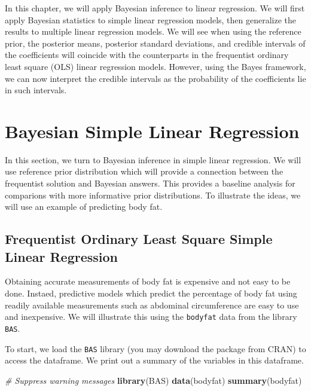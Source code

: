 \documentclass[]{book}
\newenvironment{Shaded}{\begin{snugshade}}{\end{snugshade}}
\newcommand{\KeywordTok}[1]{\textcolor[rgb]{0.13,0.29,0.53}{\textbf{#1}}}
\newcommand{\CommentTok}[1]{\textcolor[rgb]{0.56,0.35,0.01}{\textit{#1}}}
\newcommand{\NormalTok}[1]{#1}
\theoremstyle{definition}
\theoremstyle{definition}
\theoremstyle{definition}
\theoremstyle{remark}
\begin{document}
In this chapter, we will apply Bayesian inference to linear regression.
We will first apply Bayesian statistics to simple linear regression
models, then generalize the results to multiple linear regression
models. We will see when using the reference prior, the posterior means,
posterior standard deviations, and credible intervals of the
coefficients will coincide with the counterparts in the frequentist
ordinary least square (OLS) linear regression models. However, using the
Bayes framework, we can now interpret the credible intervals as the
probability of the coefficients lie in such intervals.

\section{Bayesian Simple Linear
Regression}\label{bayesian-simple-linear-regression}

In this section, we turn to Bayesian inference in simple linear
regression. We will use reference prior distribution which will provide
a connection between the frequentist solution and Bayesian answers. This
provides a baseline analysis for comparions with more informative prior
distributions. To illustrate the ideas, we will use an example of
predicting body fat.

\subsection{Frequentist Ordinary Least Square Simple Linear
Regression}\label{frequentist-ordinary-least-square-simple-linear-regression}

Obtaining accurate measurements of body fat is expensive and not easy to
be done. Instaed, predictive models which predict the percentage of body
fat using readily available measurements such as abdominal circumference
are easy to use and inexpensive. We will illustrate this using the
\texttt{bodyfat} data from the library \texttt{BAS}.

To start, we load the \texttt{BAS} library (you may download the package
from CRAN) to access the dataframe. We print out a summary of the
variables in this dataframe.

\begin{Shaded}
\begin{Highlighting}[]
\CommentTok{# Suppress warning messages}
\KeywordTok{library}\NormalTok{(BAS)}
\KeywordTok{data}\NormalTok{(bodyfat)}
\KeywordTok{summary}\NormalTok{(bodyfat)}
\end{Highlighting}
\end{Shaded}
\end{document}
